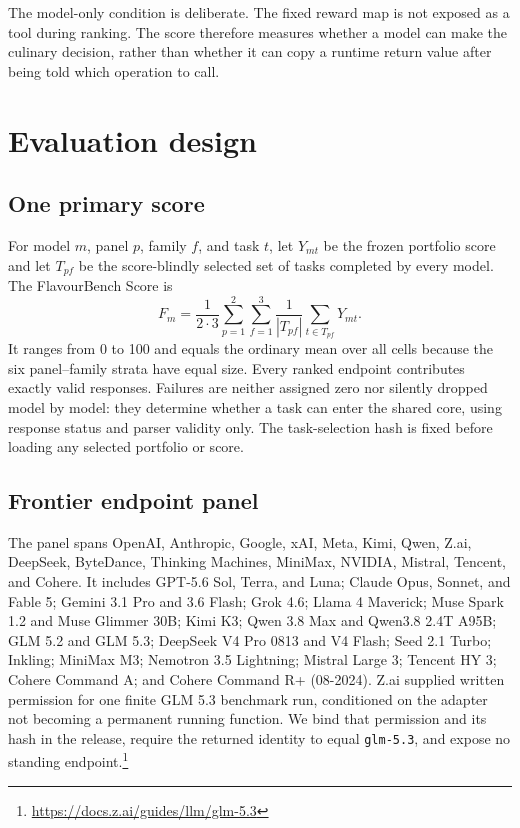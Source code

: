 \documentclass[10pt,twocolumn]{article}
\begin{document}
The model-only condition is deliberate. The fixed reward map is not exposed as a tool during
ranking. The score therefore measures whether a model can make the culinary decision, rather than
whether it can copy a runtime return value after being told which operation to call.

\section{Evaluation design}
\label{sec:design}

\subsection{One primary score}

For model $m$, panel $p$, family $f$, and task $t$, let $Y_{mt}$ be the frozen portfolio score and
let $T_{pf}$ be the score-blindly selected set of \FBTasksPerPanelFamily{} tasks completed by every
model. The FlavourBench Score is
\begin{equation}
 F_m=\frac{1}{2\cdot3}\sum_{p=1}^{2}\sum_{f=1}^{3}
      \frac{1}{|T_{pf}|}\sum_{t\in T_{pf}}Y_{mt}.
 \label{eq:fb-score}
\end{equation}
It ranges from 0 to 100 and equals the ordinary mean over all \FBTasks{} cells because the six
panel--family strata have equal size. Every ranked endpoint contributes exactly \FBTasks{} valid
responses. Failures are neither assigned zero nor silently dropped model by model: they determine
whether a task can enter the shared core, using response status and parser validity only. The
task-selection hash is fixed before loading any selected portfolio or score.

\subsection{Frontier endpoint panel}

The panel spans OpenAI, Anthropic, Google, xAI, Meta, Kimi, Qwen, Z.ai, DeepSeek, ByteDance,
Thinking Machines, MiniMax, NVIDIA, Mistral, Tencent, and Cohere. It includes GPT-5.6 Sol, Terra,
and Luna; Claude Opus, Sonnet, and Fable 5; Gemini 3.1 Pro and 3.6 Flash; Grok 4.6; Llama 4
Maverick; Muse Spark 1.2 and Muse Glimmer 30B; Kimi K3; Qwen 3.8 Max and Qwen3.8 2.4T A95B;
GLM 5.2 and GLM 5.3; DeepSeek V4 Pro 0813 and V4 Flash; Seed 2.1 Turbo; Inkling; MiniMax M3; Nemotron 3.5
Lightning; Mistral Large 3; Tencent HY 3; Cohere Command A; and Cohere Command R+ (08-2024).
Z.ai supplied written permission for one finite GLM 5.3 benchmark run, conditioned on the adapter
not becoming a permanent running function. We bind that permission and its hash in the release,
require the returned identity to equal \texttt{glm-5.3}, and expose no standing endpoint.\footnote{\url{https://docs.z.ai/guides/llm/glm-5.3}}
\end{document}
